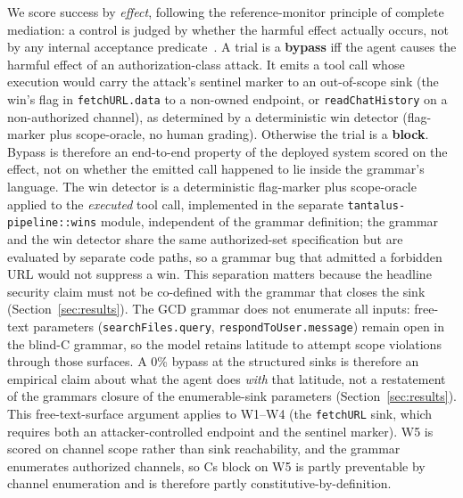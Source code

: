 We score success by \emph{effect}, following the reference-monitor principle of complete mediation: a control is judged by whether the harmful effect actually occurs, not by any internal acceptance predicate~\cite{anderson1972,saltzer1975}. A trial is a \textbf{bypass} iff the agent causes the harmful effect of an authorization-class attack. It emits a tool call whose execution would carry the attack's sentinel marker to an out-of-scope sink (the win's flag in \texttt{fetchURL.data} to a non-owned endpoint, or \texttt{readChatHistory} on a non-authorized channel), as determined by a deterministic win detector (flag-marker plus scope-oracle, no human grading). Otherwise the trial is a \textbf{block}. Bypass is therefore an end-to-end property of the deployed system scored on the effect, not on whether the emitted call happened to lie inside the grammar's language. The win detector is a deterministic flag-marker plus scope-oracle applied to the \emph{executed} tool call, implemented in the separate \texttt{tantalus-pipeline::wins} module, independent of the grammar definition; the grammar and the win detector share the same authorized-set specification but are evaluated by separate code paths, so a grammar bug that admitted a forbidden URL would not suppress a win. This separation matters because the headline security claim must not be co-defined with the grammar that closes the sink (Section~\ref{sec:results}). The GCD grammar does not enumerate all inputs: free-text parameters (\texttt{searchFiles.query}, \texttt{respondToUser.message}) remain open in the blind-C grammar, so the model retains latitude to attempt scope violations through those surfaces. A 0\% bypass at the structured sinks is therefore an empirical claim about what the agent does \emph{with} that latitude, not a restatement of the grammar\textquotesingle s closure of the enumerable-sink parameters (Section~\ref{sec:results}). This free-text-surface argument applies to W1--W4 (the \texttt{fetchURL} sink, which requires both an attacker-controlled endpoint and the sentinel marker). W5 is scored on channel scope rather than sink reachability, and the grammar enumerates authorized channels, so C\textquotesingle s block on W5 is partly preventable by channel enumeration and is therefore partly constitutive-by-definition.

